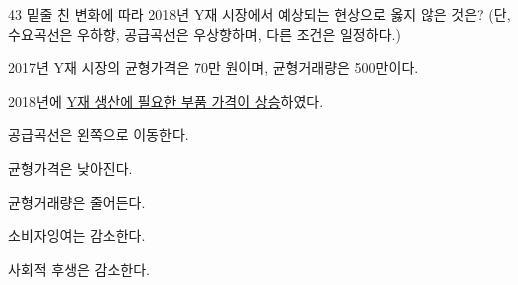 \begin{question}{43}
밑줄 친 변화에 따라 2018년 Y재 시장에서 예상되는 현상으로 옳지 않은 것은? (단, 수요곡선은 우하향, 공급곡선은 우상향하며, 다른 조건은 일정하다.)
\begin{framedtext}
2017년 Y재 시장의 균형가격은 70만 원이며, 균형거래량은 500만이다. \par
2018년에 \uline{Y재 생산에 필요한 부품 가격이 상승}하였다. \par
\end{framedtext}
\begin{choices}
  \item 공급곡선은 왼쪽으로 이동한다.
  \item 균형가격은 낮아진다.
  \item 균형거래량은 줄어든다.
  \item 소비자잉여는 감소한다.
  \item 사회적 후생은 감소한다.
\end{choices}
\end{question}
